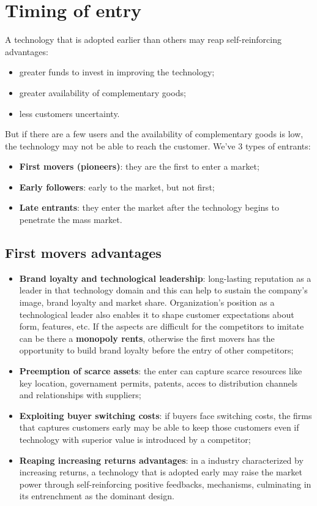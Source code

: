 \documentclass[12pt]{article}
\begin{document}
\section{Timing of entry}
A technology that is adopted earlier than others may reap self-reinforcing advantages:
\begin{itemize}
    \item greater funds to invest in improving the technology;
    \item greater availability of complementary goods;
    \item less customers uncertainty.
\end{itemize}
But if there are a few users and the availability of complementary goods is low, the technology may not be able to reach the customer.
We've 3 types of entrants:
\begin{itemize}
    \item \textbf{First movers (pioneers)}: they are the first to enter a market;
    \item \textbf{Early followers}: early to the market, but not first;
    \item \textbf{Late entrants}: they enter the market after the technology begins to penetrate the mass market.
\end{itemize}
\subsection{First movers advantages}
\begin{itemize}
    \item \textbf{Brand loyalty and technological leadership}: long-lasting reputation as a leader in that technology domain and this can help to sustain the company's image,
    brand loyalty and market share.
    Organization's position as a technological leader also enables it to shape customer expectations about form, features, etc.
    If the aspects are difficult for the competitors to imitate can be there a \textbf{monopoly rents}, otherwise the first movers has the opportunity to build brand loyalty before the entry of other competitors;
    \item \textbf{Preemption of scarce assets}: the enter can capture scarce resources like key location, governament permits, patents, acces to distribution channels and relationships with suppliers;
    \item \textbf{Exploiting buyer switching costs}: if buyers face switching costs, the firms that captures customers early may be able to keep those customers even if technology with superior 
    value is introduced by a competitor;
    \item \textbf{Reaping increasing returns advantages}: in a industry characterized by increasing returns, a technology that is adopted early may raise the market power 
    through self-reinforcing positive feedbacks, mechanisms, culminating in its entrenchment as the dominant design.
\end{itemize}
\end{document}
